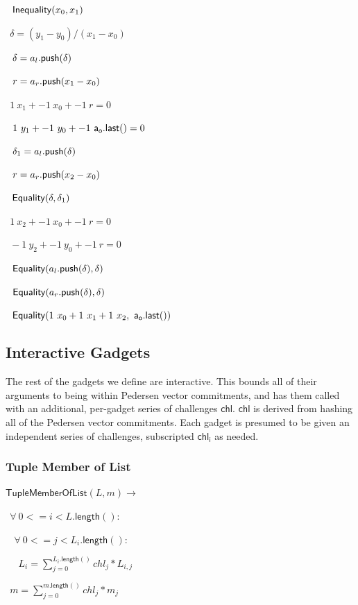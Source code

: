 \documentclass[]{article}
\begin{document}
$~~\mathsf{Inequality}(x_0, x_1)$

$~~\delta = (y_1 - y_0) / (x_1 - x_0)$

$~~\delta = a_l\mathsf{.push}(\delta)$

$~~r = a_r\mathsf{.push}(x_1 - x_0)$

$~~1 ~x_1 + -1 ~x_0 + -1 ~r = 0$

$~~1 ~y_1 + -1 ~y_0 + -1 ~\mathsf{a_o.last()} = 0$

$~~\delta_1 = a_l\mathsf{.push}(\delta)$

$~~r = a_r\mathsf{.push}(x_2 - x_0)$

$~~\mathsf{Equality}(\delta, \delta_1)$

$~~1 ~x_2 + -1 ~x_0 + -1 ~r = 0$

$~~-1 ~y_2 + -1 ~y_0 + -1 ~r = 0$

$~~\mathsf{Equality}(a_l\mathsf{.push}(\delta), \delta)$

$~~\mathsf{Equality}(a_r\mathsf{.push}(\delta), \delta)$

$~~\mathsf{Equality}(1 ~x_0 + 1 ~x_1 + 1 ~x_2, ~\mathsf{a_o.last()})$

\newpage

\subsection{Interactive Gadgets}

\newcommand{\chl}{\mathsf{chl}}

The rest of the gadgets we define are interactive. This bounds all of their arguments to being within Pedersen vector commitments, and has them called with an additional, per-gadget series of challenges $\chl$. $\chl$ is derived from hashing all of the Pedersen vector commitments. Each gadget is presumed to be given an independent series of challenges, subscripted $\mathsf{chl_i}$ as needed.

\subsubsection{Tuple Member of List}

\newcommand{\tuplememberlist}{\mathsf{TupleMemberOfList}}

$\tuplememberlist(L, m) \rightarrow$

$~~\forall ~0 <= i < L\mathsf{.length}():$

$~~~~\forall ~0 <= j < L_i\mathsf{.length}():$

$~~~~~~L_i = \sum^{L_i\mathsf{.length}()}_{j=0} chl_j * L_{i,j}$

$~~m = \sum^{m\mathsf{.length}()}_{j=0} chl_j * m_j$
\end{document}
